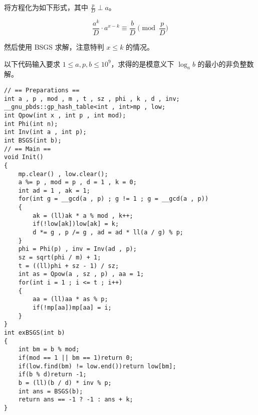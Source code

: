 将方程化为如下形式，其中 $\frac{p}{D} \perp a$。

$$\frac{a^k}{D}\cdot a^{x-k}\equiv\frac{b}{D} \pmod{\frac{p}{D}}$$

然后使用 BSGS 求解，注意特判 $x \le k$ 的情况。

以下代码输入要求 $1\le a,p,b\le10^9$，求得的是模意义下 $\log_{a}{b}$ 的最小的非负整数解。

\begin{verbatim}
// == Preparations ==
int a , p , mod , m , t , sz , phi , k , d , inv; 
__gnu_pbds::gp_hash_table<int , int>mp , low;
int Qpow(int x , int p , int mod);
int Phi(int n);
int Inv(int a , int p);
int BSGS(int b);
// == Main ==
void Init()
{
    mp.clear() , low.clear();
    a %= p , mod = p , d = 1 , k = 0; 
    int ad = 1 , ak = 1; 
    for(int g = __gcd(a , p) ; g != 1 ; g = __gcd(a , p))
    {
        ak = (ll)ak * a % mod , k++;
        if(!low[ak])low[ak] = k;
        d *= g , p /= g , ad = ad * ll(a / g) % p;
    }
    phi = Phi(p) , inv = Inv(ad , p);
    sz = sqrt(phi / m) + 1;
    t = ((ll)phi + sz - 1) / sz;
    int as = Qpow(a , sz , p) , aa = 1;
    for(int i = 1 ; i <= t ; i++)
    {
        aa = (ll)aa * as % p;
        if(!mp[aa])mp[aa] = i;
    }
}
int exBSGS(int b)
{
    int bm = b % mod;
    if(mod == 1 || bm == 1)return 0;    
    if(low.find(bm) != low.end())return low[bm];
    if(b % d)return -1;
    b = (ll)(b / d) * inv % p;
    int ans = BSGS(b);
    return ans == -1 ? -1 : ans + k;
}
\end{verbatim}